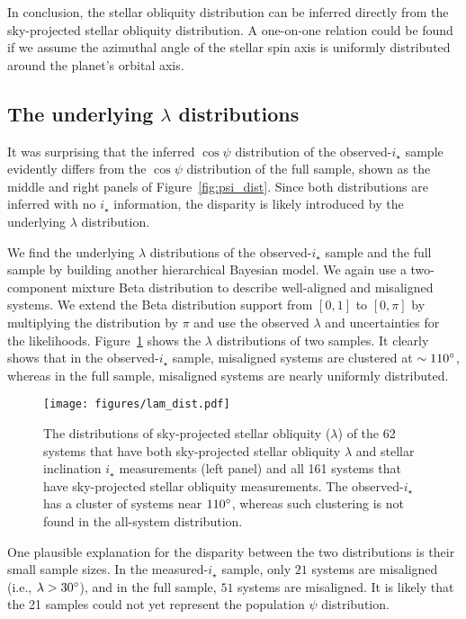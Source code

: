 \documentclass[twocolumn,times]{aastex631}
\newcommand{\numistar}{62\xspace}
\newcommand{\numall}{161\xspace}
\begin{document}
In conclusion, the stellar obliquity distribution can be inferred directly from the sky-projected stellar obliquity distribution. A one-on-one relation could be found if we assume the azimuthal angle of the stellar spin axis is uniformly distributed around the planet's orbital axis.

\subsection{The underlying \texorpdfstring{$\lambda$}{lambda} distributions}

It was surprising that the inferred $\cos{\psi}$ distribution of the observed-$i_\star$ sample evidently differs from the $\cos{\psi}$ distribution of the full sample, shown as the middle and right panels of Figure~\ref{fig:psi_dist}. Since both distributions are inferred with no $i_\star$ information, the disparity is likely introduced by the underlying $\lambda$ distribution.

We find the underlying $\lambda$ distributions of the observed-$i_\star$ sample and the full sample by building another hierarchical Bayesian model. We again use a two-component mixture Beta distribution to describe well-aligned and misaligned systems. We extend the Beta distribution support from $[0,1]$ to $[0,\pi]$ by multiplying the distribution by $\pi$ and use the observed $\lambda$ and uncertainties for the likelihoods. Figure~\ref{fig:lam_dist} shows the $\lambda$ distributions of two samples. It clearly shows that in the observed-$i_\star$ sample, misaligned systems are clustered at $\sim 110\mbox{$^\circ$}$, whereas in the full sample, misaligned systems are nearly uniformly distributed. 

\begin{figure*}[ht!]
    \begin{centering}
        \texttt{[image: figures/lam\_dist.pdf]}
        \caption{The distributions of sky-projected stellar obliquity ($\lambda$) of the \numistar systems that have both sky-projected stellar obliquity $\lambda$ and stellar inclination $i_\star$ measurements (left panel) and all \numall systems that have sky-projected stellar obliquity measurements. The observed-$i_\star$ has a cluster of systems near $110\mbox{$^\circ$}$, whereas such clustering is not found in the all-system distribution.}
        \label{fig:lam_dist}
    \end{centering}
\end{figure*}

One plausible explanation for the disparity between the two distributions is their small sample sizes. In the measured-$i_\star$ sample, only $21$ systems are misaligned  (i.e., $\lambda > 30\mbox{$^\circ$}$), and in the full sample, $51$ systems are misaligned. It is likely that the 21 samples could not yet represent the population $\psi$ distribution. 
\end{document}
